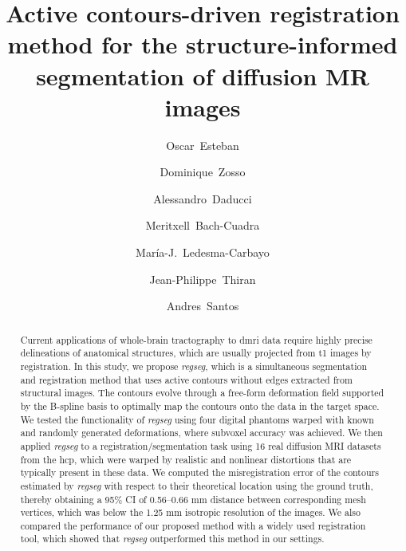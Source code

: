 \documentclass[3p,authoryear,fleqn]{elsarticle}
\providecommand{\regseg}{\emph{regseg}}
\begin{document}
\begin{frontmatter}


\title{Active contours-driven registration method for the structure-informed segmentation of diffusion MR images}

\author[bit,ciber]{Oscar~Esteban}
\author[ucla]{Dominique~Zosso}
\author[lts5]{Alessandro~Daducci}
\author[chuv,lts5]{Meritxell~Bach-Cuadra}
\author[bit,ciber]{Mar\'ia-J.~Ledesma-Carbayo}
\author[lts5]{Jean-Philippe~Thiran}
\author[bit,ciber]{Andres~Santos}


\address[bit]{Biomedical Image Technologies (BIT), ETSI Telecomunicaci\'on, Universidad Polit\'ecnica de Madrid, Madrid, Spain}
\address[ciber]{Centro de Investigaci\'on Biom\'edica en Red en Bioingenier\'ia, Biomateriales y Nanomedicina (CIBER-BBN), Spain}
\address[ucla]{Department of Mathematics, University of California,
Los Angeles (UCLA), Los Angeles, CA, US}
\address[lts5]{Signal Processing Laboratory (LTS5), \'Ecole Polytechnique
F\'ed\'erale de Lausanne (EPFL), Lausanne, Switzerland}
\address[chuv]{Dept. of Radiology, CIBM, University
Hospital Center (CHUV) and University of Lausanne (UNIL), Lausanne, Switzerland}


\begin{abstract}
\makeatletter{}Current applications of whole-brain tractography to \acrlong*{dmri} data require highly precise
  delineations of anatomical structures, which are usually projected from \acrlong*{t1} images
  by registration.
In this study, we propose \regseg{}, which is a simultaneous segmentation and registration method
  that uses active contours without edges extracted from structural images.
The contours evolve through a free-form deformation field supported by the B-spline basis
  to optimally map the contours onto the data in the target space.
We tested the functionality of \regseg{} using four digital phantoms warped with known and
  randomly generated deformations, where subvoxel accuracy was achieved.
We then applied \regseg{} to a registration/segmentation task using 16 real diffusion MRI
  datasets from the \acrlong*{hcp}, which were warped by realistic and nonlinear distortions that are typically
  present in these data.
We computed the misregistration error of the contours estimated by \regseg{} with respect
  to their theoretical location using the ground truth, thereby obtaining a 95\% CI of 0.56--0.66 mm
  distance between corresponding mesh vertices, which was below the 1.25 mm isotropic resolution of the images.
We also compared the performance of our proposed method with a widely used registration tool, which showed
  that \regseg{} outperformed this method in our settings. 
\end{abstract}


\end{frontmatter}
\end{document}
